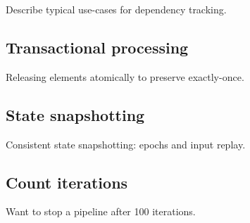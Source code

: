 \label {fs-acker-motivation}

Describe typical use-cases for dependency tracking.

\subsection{Transactional processing}
Releasing elements atomically to preserve exactly-once.

\subsection{State snapshotting}
Consistent state snapshotting: epochs and input replay.

\subsection{Count iterations}
Want to stop a pipeline after 100 iterations.


